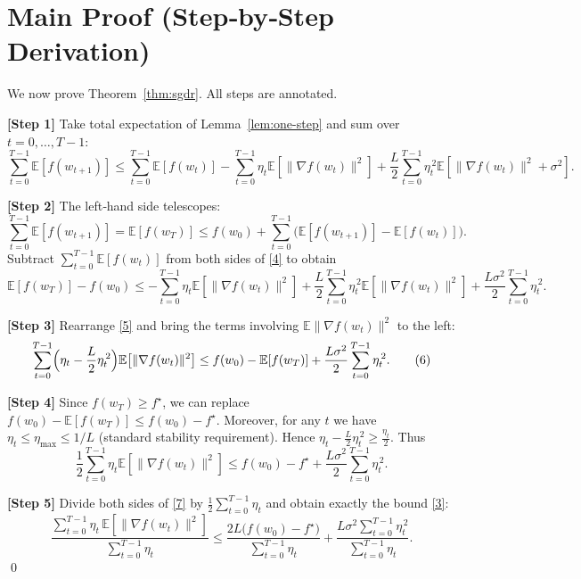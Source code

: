 \documentclass{article}
\begin{document}
\section*{Main Proof (Step‑by‑Step Derivation)}
We now prove Theorem~\ref{thm:sgdr}.  All steps are annotated.

\noindent\textbf{[Step 1]}  Take total expectation of Lemma~\ref{lem:one-step}
and sum over $t=0,\dots,T-1$:
\[
\sum_{t=0}^{T-1}\mathbb{E}\!\left[f(w_{t+1})\right]
\le
\sum_{t=0}^{T-1}\mathbb{E}\!\left[f(w_t)\right]
-\sum_{t=0}^{T-1}\eta_t\mathbb{E}\!\left[\|\nabla f(w_t)\|^2\right]
+\frac{L}{2}\sum_{t=0}^{T-1}\eta_t^{\,2}
\mathbb{E}\!\left[\|\nabla f(w_t)\|^2+\sigma^2\right].
\tag{4}
\]

\noindent\textbf{[Step 2]}  The left‑hand side telescopes:
\[
\sum_{t=0}^{T-1}\mathbb{E}[f(w_{t+1})]
=
\mathbb{E}[f(w_T)]\le f(w_0)+\sum_{t=0}^{T-1}\bigl(\mathbb{E}[f(w_{t+1})]-\mathbb{E}[f(w_t)]\bigr).
\]
Subtract $\sum_{t=0}^{T-1}\mathbb{E}[f(w_t)]$ from both sides of \eqref{4} to obtain
\[
\mathbb{E}[f(w_T)]-f(w_0)
\le
-\sum_{t=0}^{T-1}\eta_t\mathbb{E}\!\left[\|\nabla f(w_t)\|^2\right]
+\frac{L}{2}\sum_{t=0}^{T-1}\eta_t^{\,2}
\mathbb{E}\!\left[\|\nabla f(w_t)\|^2\right]
+\frac{L\sigma^2}{2}\sum_{t=0}^{T-1}\eta_t^{\,2}.
\tag{5}
\]

\noindent\textbf{[Step 3]}  Rearrange \eqref{5} and bring the terms involving
$\mathbb{E}\|\nabla f(w_t)\|^2$ to the left:
\[
\sum_{t=0}^{T-1}\Bigl(\eta_t-\frac{L}{2}\eta_t^{\,2}\Bigr)
\mathbb{E}\!\left[\|\nabla f(w_t)\|^2\right]
\le
f(w_0)-\mathbb{E}[f(w_T)]
+\frac{L\sigma^2}{2}\sum_{t=0}^{T-1}\eta_t^{\,2}.
\tag{6}
\]

\noindent\textbf{[Step 4]}  Since $f(w_T)\ge f^\star$, we can replace
$f(w_0)-\mathbb{E}[f(w_T)]\le f(w_0)-f^\star$.
Moreover, for any $t$ we have $\eta_t\le\eta_{\max}\le 1/L$ (standard stability
requirement).  Hence $\eta_t-\frac{L}{2}\eta_t^{\,2}
\ge\frac{\eta_t}{2}$.
Thus
\[
\frac{1}{2}\sum_{t=0}^{T-1}\eta_t
\mathbb{E}\!\left[\|\nabla f(w_t)\|^2\right]
\le
f(w_0)-f^\star
+\frac{L\sigma^2}{2}\sum_{t=0}^{T-1}\eta_t^{\,2}.
\tag{7}
\]

\noindent\textbf{[Step 5]}  Divide both sides of \eqref{7} by
$\frac12\sum_{t=0}^{T-1}\eta_t$ and obtain exactly the bound \eqref{3}:
\[
\frac{\sum_{t=0}^{T-1}\eta_t\,
\mathbb{E}[\|\nabla f(w_t)\|^2]}
{\sum_{t=0}^{T-1}\eta_t}
\le
\frac{2L\bigl(f(w_0)-f^\star\bigr)}{\sum_{t=0}^{T-1}\eta_t}
+\frac{L\sigma^2\sum_{t=0}^{T-1}\eta_t^{\,2}}
      {\sum_{t=0}^{T-1}\eta_t}.
\]
\qed
\end{document}

